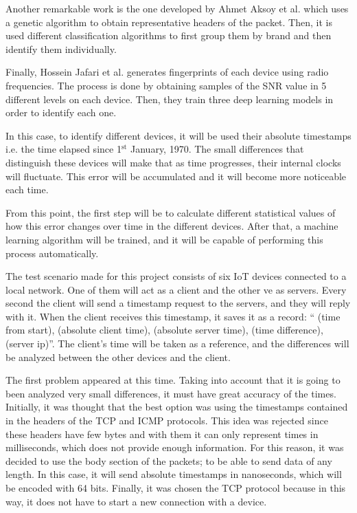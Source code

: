 Another remarkable work is the one developed by Ahmet Aksoy et al. \cite{aksoy2019automated} which uses a genetic algorithm to obtain representative headers of the packet. Then, it is used different classification algorithms to first group them by brand and then identify them individually. 


Finally, Hossein Jafari et al. \cite{jafari2018iot} generates fingerprints of each device using radio frequencies. The process is done by obtaining samples of the SNR value in 5 different levels on each device. Then, they train three deep learning models in order to identify each one.


In this case, to identify different devices, it will be used their absolute timestamps i.e. the time elapsed since 1$^\text{st}$ January, 1970. The small differences that distinguish these devices will make that as time progresses, their internal clocks will fluctuate. This error will be accumulated and it will become more noticeable each time.


From this point, the first step will be to calculate different statistical values of how this error changes over time in the different devices. After that, a machine learning algorithm will be trained, and it will be capable of performing this process automatically.


The test scenario made for this project consists of six IoT devices connected to a local network. One of them will act as a client and the other ve as servers. Every second the client will send a timestamp request to the servers, and they will reply with it. When the client receives this timestamp, it saves it as a record: “ (time from start), (absolute client time), (absolute server time), (time difference), (server ip)”. The client's time will be taken as a reference, and the differences will be analyzed between the other devices and the client.


The first problem appeared at this time. Taking into account that it is going to been analyzed very small differences, it must have great accuracy of the times. Initially, it was thought that the best option was using the timestamps contained in the headers of the TCP and ICMP protocols. This idea was rejected since these headers have few bytes and with them it can only represent times in milliseconds, which does not provide enough information. For this reason, it was decided to use the body section of the packets; to be able to send data of any length. In this case, it will send absolute timestamps in nanoseconds, which will be encoded with 64 bits. Finally, it was chosen the TCP protocol because in this way, it does not have to start a new connection with a device. 


